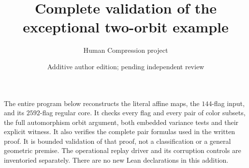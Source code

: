 \documentclass[a4paper,11pt]{article}
\title{Complete validation of the exceptional two-orbit example}
\author{Human Compression project}\date{Additive author edition; pending independent review}
\begin{document}
\maketitle
The entire program below reconstructs the literal affine maps, the $144$-flag
input, and its $2592$-flag regular core. It checks every flag and every pair
of color subsets, the full automorphism orbit argument, both embedded
variance tests and their explicit witness. It also verifies the complete
pair formulas used in the written proof. It is bounded validation of
that proof, not a classification or a general geometric premise.
The operational replay driver and its corruption controls are inventoried
separately. There are no new Lean declarations in this addition.
\end{document}
